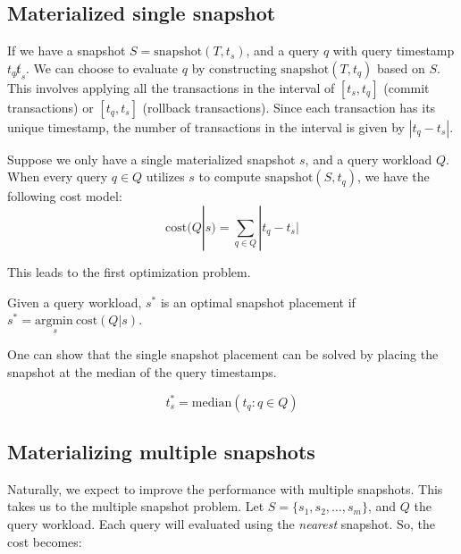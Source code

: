 \subsection{Materialized single snapshot}

\newcommand{\snapshot}{\mathrm{snapshot}}
\newcommand{\cost}{\mathrm{cost}}
\newcommand{\opt}{\mathrm{opt}}

If we have a snapshot $S = \mathrm{snapshot}(T, t_s)$, and a query $q$ with
query timestamp $t_q\not t_s$.  We can choose to evaluate $q$ by
constructing $\snapshot(T, t_q)$ based on $S$.  This involves applying all the
transactions in the interval of $[t_s, t_q]$ (commit transactions) or $[t_q,
t_s]$ (rollback transactions). Since each transaction has its unique timestamp,
the number of transactions in the interval is given by $|t_q - t_s|$.

Suppose we only have a single materialized snapshot $s$, and a query workload
$Q$.  When every query $q\in Q$ utilizes $s$ to compute $\snapshot(S, t_q)$,
we have the following cost model:
$$\cost(Q|s) = \sum_{q\in Q} |t_q - t_s|$$

This leads to the first optimization problem.

\newcommand{\argmin}[1]{\underset{#1}{\mathrm{argmin}\ }}

\begin{definition}
    Given a query workload, $s^*$ is an optimal snapshot placement
    if $s^* = \argmin{s}\cost(Q|s)$.
\end{definition}

One can show that the single snapshot placement can be solved by placing the
snapshot at the median of the query timestamps.

\begin{theorem}
    $$ t_s^* = \mathrm{median}(t_q : q\in Q) $$
    \label{thm:single}
\end{theorem}

\subsection{Materializing multiple snapshots}

Naturally, we expect to improve the performance with multiple snapshots.  This
takes us to the multiple snapshot problem. Let $S = \{s_1, s_2, \dots, s_m\}$,
and $Q$ the query workload.  Each query will evaluated using the {\em nearest} snapshot.
So, the cost becomes:

